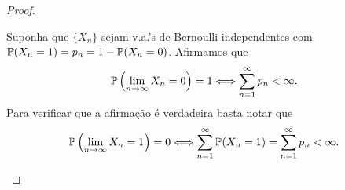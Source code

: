 \begin{proof}
\begin{exemplo}[Continuação]
	Suponha que $\{X_n\}$ sejam v.a.'s de Bernoulli 
	independentes com $\P(X_n=1)=p_n=1-\P(X_n=0)$. 
	Afirmamos que  
		\[
			\P\left( \lim_{n\to\infty} X_n=0\right)=1
			\Longleftrightarrow
			\sum_{n=1}^{\infty}p_n<\infty.
		\]
	Para verificar que a afirmação é verdadeira
	basta notar que 
	\[
		\P\left( \lim_{n\to\infty} X_n=1\right)=0
		\Longleftrightarrow
		\sum_{n=1}^{\infty} \P(X_n=1)
		=		
		\sum_{n=1}^{\infty}p_n<\infty.
	\]
\end{exemplo}


\end{proof}